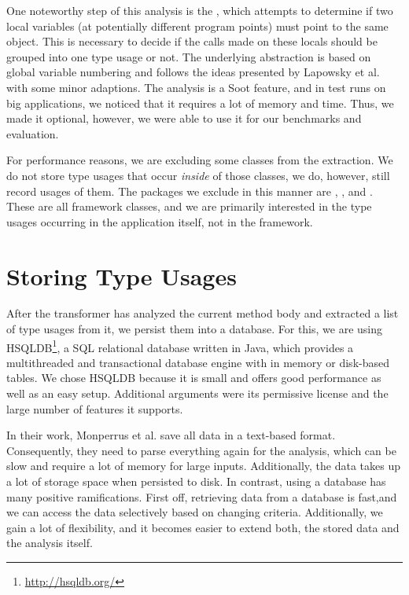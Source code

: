 One noteworthy step of this analysis is the , which attempts to determine if two local variables (at potentially different program points) must point to the same object.
This is necessary to decide if the calls made on these locals should be grouped into one type usage or not.
The underlying abstraction is based on global variable numbering and follows the ideas presented by Lapowsky et al. \cite{lapkowski1998extended} with some minor adaptions.
The analysis is a Soot feature, and in test runs on big applications, we noticed that it requires a lot of memory and time.
Thus, we made it optional, however, we were able to use it for our benchmarks and evaluation.

For performance reasons, we are excluding some classes from the extraction.
We do not store type usages that occur \emph{inside} of those classes, we do, however, still record usages of them.
The packages we exclude in this manner are , ,  and  .
These are all framework classes, and we are primarily interested in the type usages occurring in the application itself, not in the framework.

\section{Storing Type Usages}

After the transformer has analyzed the current method body and extracted a list of type usages from it, we persist them into a database.
For this, we are using HSQLDB\footnote{\url{http://hsqldb.org/}}, a SQL relational database written in Java, which provides a multithreaded and transactional database engine with in memory or disk-based tables.
We chose HSQLDB because it is small and offers good performance as well as an easy setup.
Additional arguments were its permissive license and the large number of features it supports.

In their work, Monperrus et al. save all data in a text-based format.
Consequently, they need to parse everything again for the analysis, which can be slow and require a lot of memory for large inputs.
Additionally, the data takes up a lot of storage space when persisted to disk.
In contrast, using a database has many positive ramifications.
First off, retrieving data from a database is fast,and we can access the data selectively based on changing criteria.
Additionally, we gain a lot of flexibility, and it becomes easier to extend both, the stored data and the analysis itself.

